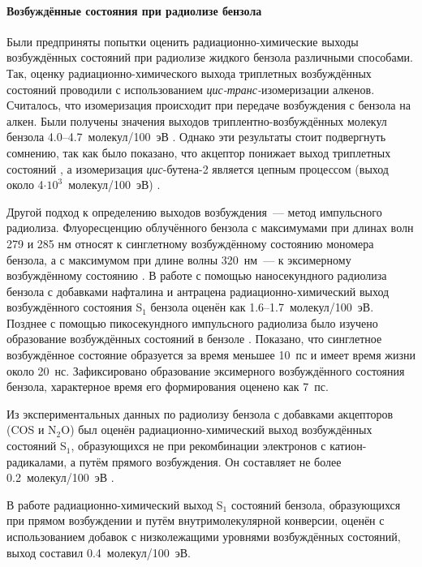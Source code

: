 { \paragraph{Возбуждённые состояния при радиолизе бензола\\}
 \label{ex}
 
Были предприняты попытки оценить радиационно-химические выходы возбуждённых состояний при радиолизе жидкого бензола различными способами. 
Так, оценку радиационно-химического выхода триплетных возбуждённых состояний проводили 
с использованием {\it цис-транс-}изомеризации алкенов. Считалось, что изомеризация происходит при передаче возбуждения с бензола на алкен. 
Были получены значения выходов триплентно-возбуждённых молекул бензола 4.0--4.7~молекул/100~эВ \cite{Golub1966, Cundall1970}. 
Однако эти результаты стоит подвергнуть сомнению, так как было показано, что акцептор понижает выход триплетных состояний \cite{Hentz1969}, а 
изомеризация {\it цис}-бутена-2 является цепным процессом (выход около 4$\cdot10^3$~молекул/100~эВ) \cite{Harata1977}.

Другой подход к определению выходов возбуждения~--- метод импульсного радиолиза. Флуоресценцию облучённого бензола с максимумами при длинах волн  
279 и 285 нм относят к синглетному возбуждённому состоянию мономера бензола, а с максимумом при длине волны 320~нм~--- к 
эксимерному возбуждённому состоянию \cite{Horrocks1970, West1970}. В работе \cite{Thomas1969} с помощью наносекундного радиолиза бензола 
с добавками нафталина и антрацена радиационно-химический выход возбуждённого состояния S$_1$ бензола оценён как 1.6--1.7~молекул/100~эВ.
 Позднее с помощью пикосекундного импульсного радиолиза было изучено 
образование возбуждённых состояний в бензоле \cite{beck1972}. Показано, что синглетное возбуждённое состояние образуется за время 
меньшее 10~пс и  имеет время жизни около 20~нс. 
Зафиксировано образование эксимерного возбуждённого состояния бензола, характерное время его формирования оценено как 7~пс.

Из экспериментальных данных по радиолизу бензола с добавками акцепторов (COS и N$_2$O) был оценён радиационно-химический выход возбуждённых состояний S$_1$, образующихся не при
 рекомбинации электронов с катион-радикалами, а путём прямого возбуждения. Он составляет не более 0.2~молекул/100~эВ \cite{Sato1972}.
 
 В работе \cite{HorrocksDL1970} радиационно-химический выход S$_1$ состояний бензола, образующихся при прямом возбуждении и путём внутримолекулярной конверсии, 
 оценён с использованием добавок с низколежащими уровнями возбуждённых состояний, выход составил 0.4~молекул/100~эВ.

}
